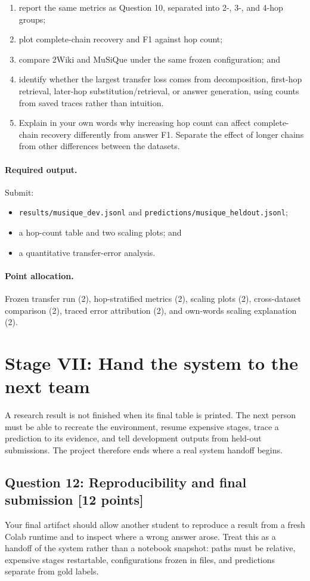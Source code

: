 \documentclass[11pt]{article}
\newcommand{\code}[1]{\texttt{#1}}
\newcommand{\question}[3]{%
  \subsection[Question #1: #2 (#3 points)]{Question #1: #2 \hfill [#3 points]}%
}
\newcommand{\deliverables}{\paragraph{Required output.}}
\newcommand{\grading}{\paragraph{Point allocation.}}
\begin{document}
\begin{enumerate}[label=(\alph*)]
  \item report the same metrics as Question 10, separated into 2-, 3-, and
        4-hop groups;
  \item plot complete-chain recovery and F1 against hop count;
  \item compare 2Wiki and MuSiQue under the same frozen configuration; and
  \item identify whether the largest transfer loss comes from decomposition,
        first-hop retrieval, later-hop substitution/retrieval, or answer
        generation, using counts from saved traces rather than intuition.
  \item Explain in your own words why increasing hop count can affect
        complete-chain recovery differently from answer F1. Separate the
        effect of longer chains from other differences between the datasets.
\end{enumerate}

\deliverables Submit:
\begin{itemize}
  \item \code{results/musique\_dev.jsonl} and
        \code{predictions/musique\_heldout.jsonl};
  \item a hop-count table and two scaling plots; and
  \item a quantitative transfer-error analysis.
\end{itemize}

\grading Frozen transfer run (2), hop-stratified metrics (2), scaling plots
(2), cross-dataset comparison (2), traced error attribution (2), and
own-words scaling explanation (2).

\section{Stage VII: Hand the system to the next team}

A research result is not finished when its final table is printed. The next
person must be able to recreate the environment, resume expensive stages,
trace a prediction to its evidence, and tell development outputs from held-out
submissions. The project therefore ends where a real system handoff begins.

\question{12}{Reproducibility and final submission}{12}

Your final artifact should allow another student to reproduce a result from a
fresh Colab runtime and to inspect where a wrong answer arose. Treat this as a
handoff of the system rather than a notebook snapshot: paths must be relative,
expensive stages restartable, configurations frozen in files, and predictions
separate from gold labels.
\end{document}
